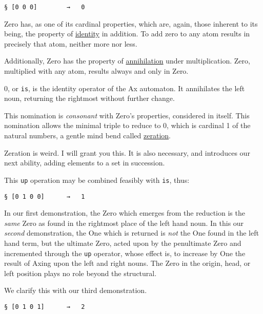 \documentclass[twoside]{article}
\begin{document}
\begin{lstlisting}[style=listingblock]
§ [0 0 0]        →   0
\end{lstlisting}

Zero has, as one of its cardinal properties, which are, again, those inherent to its being, the property of \href{https://en.wikipedia.org/wiki/Identity_function}{identity} in addition. To add zero to any atom results in precisely that atom, neither more nor less.

Additionally, Zero has the property of \href{https://en.wikipedia.org/wiki/Absorbing_element}{annihilation} under multiplication. Zero, multiplied with any atom, results always and only in Zero.

0, or \texttt{is}, is the identity operator of the Ax automaton. It annihilates the left noun, returning the rightmost without further change.

This nomination is \emph{consonant} with Zero's properties, considered in itself. This nomination allows the minimal triple to reduce to 0, which is cardinal 1 of the natural numbers, a gentle mind bend called \href{https://en.wikipedia.org/wiki/Successor_function}{zeration}.

Zeration is weird. I will grant you this. It is also necessary, and introduces our next ability, adding elements to a set in succession.

This \texttt{up} operation may be combined feasibly with \texttt{is}, thus:

\begin{lstlisting}[style=listingblock]
§ [0 1 0 0]      →   1
\end{lstlisting}

In our first demonstration, the Zero which emerges from the reduction is the \emph{same} Zero as found in the rightmost place of the left hand noun. In this our \emph{second} demonstration, the One which is returned is \emph{not} the One found in the left hand term, but the ultimate Zero, acted upon by the penultimate Zero and incremented through the \texttt{up} operator, whose effect is, to increase by One the result of Axing upon the left and right nouns. The Zero in the origin, head, or left position plays no role beyond the structural.

We clarify this with our third demonstration.

\begin{lstlisting}[style=listingblock]
§ [0 1 0 1]      →   2
\end{lstlisting}
\end{document}
